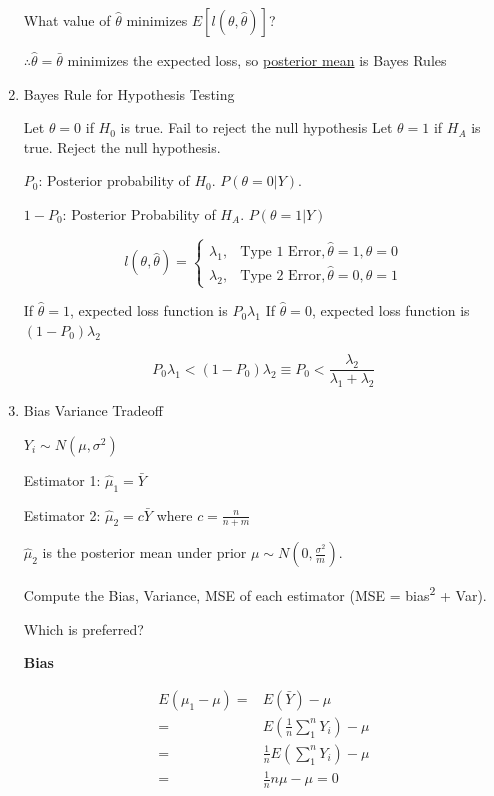 \documentclass[11pt]{article}
\begin{document}
\begin{enumerate}
What value of \(\hat \theta\) minimizes \(E [l(\theta, \hat \theta)]\)?

\(\therefore \hat \theta = \bar \theta\) minimizes the expected loss, so \uline{posterior mean} is Bayes Rules

\item Bayes Rule for Hypothesis Testing
\label{sec:orgdb9cdd9}

Let \(\theta = 0\) if \(H_0\) is true. Fail to reject the null hypothesis
Let \(\theta = 1\) if \(H_A\) is true. Reject the null hypothesis.

\(P_0\): Posterior probability of \(H_0\). \(P(\theta = 0 | Y)\).

\(1 - P_0\): Posterior Probability of \(H_A\). \(P(\theta = 1 | Y)\)

$$
l(\theta, \hat \theta) = \begin{cases}
\lambda_1, & \text{Type 1 Error}, \hat \theta = 1, \theta = 0\\
\lambda_2, & \text{Type 2 Error}, \hat \theta = 0, \theta = 1
\end{cases}
$$

If \(\hat \theta = 1\), expected loss function is \(P_0 \lambda_1\)
If \(\hat \theta = 0\), expected loss function is \((1 - P_0) \lambda_2\)

$$
P_0 \lambda_1 < (1 - P_0) \lambda_2 \equiv P_0 < \frac{\lambda_2}{\lambda_1 + \lambda_2}
$$

\item Bias Variance Tradeoff
\label{sec:orgb94b502}

\(Y_i \sim N(\mu, \sigma^2)\)

Estimator 1: \(\hat \mu_1 = \bar Y\)

Estimator 2: \(\hat \mu_2 = c \bar Y\) where \(c = \frac{n}{n + m}\)

\(\hat \mu_2\) is the posterior mean under prior \(\mu \sim N(0, \frac{\sigma^2}{m})\).

Compute the Bias, Variance, MSE of each estimator (MSE = bias\textsuperscript{2} + Var).

Which is preferred?

\textbf{Bias}

\begin{equation}
\begin{split}
E(\mu_1 - \mu) = & E(\bar Y) - \mu\\
= & E(\frac{1}{n} \sum_{1}^{n} Y_i) - \mu\\
= & \frac{1}{n} E(\sum_{1}^{n} Y_i) - \mu\\
= & \frac{1}{n} n \mu - \mu = 0
\end{split}
\end{equation}


\end{enumerate}
\end{document}
